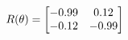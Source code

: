 \documentclass[preview]{standalone}
\begin{document}
\begin{align*}
\special{dvisvgm:raw <g id='unique000'>}R(\theta) = \begin{bmatrix}-0.99 & 0.12\\-0.12 & -0.99\end{bmatrix}\special{dvisvgm:raw </g>}
\end{align*}
\end{document}
